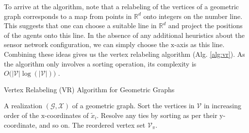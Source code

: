 \documentclass[twocolumn]{article}
\theoremstyle{plain}
\theoremstyle{definition}
\theoremstyle{definition}
\theoremstyle{remark}
\newtheorem{remark}{Remark}
\begin{document}
To arrive at the algorithm, note that a relabeling of the vertices of a geometric graph corresponds to a map from points in $\mathbb R^d$ onto integers on the number line. This suggests that one can choose a suitable line in $\mathbb R^d$ and project the positions of the agents onto this line. In the absence of any additional heuristics about the sensor network configuration, we can simply choose the $\textrm{x}$-axis 
as this line. Combining these ideas gives us the vertex relabeling algorithm (Alg. \ref{alg:vr}). As the algorithm only involves a sorting operation, its complexity is $O\big(|\mathcal V|\log(|\mathcal V|)\big)$ \cite{cormen2022introduction}.

\begin{algorithm}
\caption{Vertex Relabeling (VR) Algorithm for Geometric Graphs}
\begin{algorithmic}[1]
\REQUIRE A realization $(\mathcal G,\mathcal X)$ of a geometric graph.
\STATE Sort the vertices in $\mathcal V$ in increasing order of the $\textrm{x}$-coordinates of $\tilde x_i$. Resolve any ties by sorting as per their $\textrm{y}$-coordinate, and so on.
\RETURN The reordered vertex set $\mathcal V_\pi$.
\end{algorithmic}
\label{alg:vr}
\end{algorithm}
\end{document}
